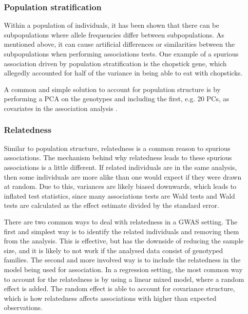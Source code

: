 \subsubsection{Population stratification}
Within a population of individuals, it has been shown that there can be subpopulations where allele frequencies differ between subpopulations. As mentioned above, it can cause artificial differences or similarities between the subpopulations when performing associations tests. One example of a spurious association driven by population stratification is the chopstick gene, which allegedly accounted for half of the variance in being able to eat with chopsticks.\cite{marees2018tutorial} 

A common and simple solution to account for population structure is by performing a PCA on the genotypes and including the first, e.g. 20 PCs, as covariates in the association analysis \cite{price2006principal,price2010new}.

\subsubsection{Relatedness}
Similar to population structure, relatedness is a common reason to spurious associations. The mechanism behind why relatedness leads to these spurious associations is a little different. If related individuals are in the same analysis, then some individuals are more alike than one would expect if they were drawn at random. Due to this, variances are likely biased downwards, which leads to inflated test statistics, since many associations tests are Wald tests and Wald tests are calculated as the effect estimate divided by the standard error. 

There are two common ways to deal with relatedness in a GWAS setting. The first and simplest way is to identify the related individuals and removing them from the analysis. This is effective, but has the downside of reducing the sample size, and it is likely to not work if the analysed data consist of genotyped families. The second and more involved way is to include the relatedness in the model being used for association. In a regression setting, the most common way to account for the relatedness is by using a linear mixed model, where a random effect is added. The random effect is able to account for covariance structure, which is how relatedness affects associations with higher than expected observations.\cite{yu2006unified, kang2008efficient}

